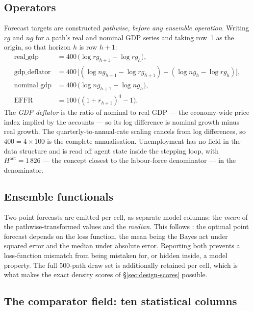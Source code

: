 \documentclass[11pt,a4paper]{article}
\begin{document}
\subsection{Operators}

Forecast targets are constructed \emph{pathwise, before any ensemble operation}. Writing $rg$ and
$ng$ for a path's real and nominal GDP series and taking row~1 as the origin, so that horizon $h$
is row $h+1$:
\begin{align}
\text{real\_gdp} &= 400\,\big(\log rg_{h+1} - \log rg_{h}\big), \\
\text{gdp\_deflator} &= 400\,\big[(\log ng_{h+1}-\log rg_{h+1}) - (\log ng_{h}-\log rg_{h})\big], \\
\text{nominal\_gdp} &= 400\,\big(\log ng_{h+1} - \log ng_{h}\big), \\
\text{EFFR} &= 100\,\big((1+r_{h+1})^4-1\big).
\end{align}
The \emph{GDP deflator} is the ratio of nominal to real GDP --- the economy-wide price index
implied by the accounts --- so its log difference is nominal growth minus real growth. The
quarterly-to-annual-rate scaling cancels from log differences, so $400 = 4\times 100$ is the
complete annualisation. Unemployment has no field in the data structure and is read off agent
state inside the stepping loop, with $H^{\mathrm{act}}=1\,826$ --- the concept closest to the
labour-force denominator --- in the denominator.

\subsection{Ensemble functionals}

Two point forecasts are emitted per cell, as separate model columns: the \emph{mean} of the
pathwise-transformed values and the \emph{median}. This follows \citet{gneiting2011}: the optimal
point forecast depends on the loss function, the mean being the Bayes act under squared error and
the median under absolute error. Reporting both prevents a loss-function mismatch from being
mistaken for, or hidden inside, a model property. The full 500-path draw set is additionally
retained per cell, which is what makes the exact density scores of \S\ref{sec:design-scores}
possible.

\subsection{The comparator field: ten statistical columns}
\end{document}
